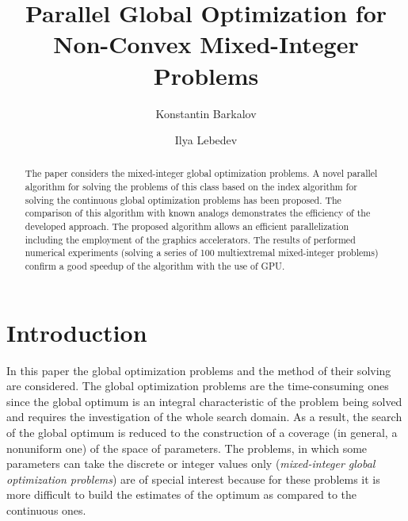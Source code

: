 \documentclass{llncs}
\begin{document}
\mainmatter 

\title{Parallel Global Optimization for Non-Convex Mixed-Integer Problems
}
\author{Konstantin Barkalov \and Ilya Lebedev %
\\
}


\maketitle

\begin{abstract}

The paper considers the mixed-integer global optimization problems. A novel 
parallel algorithm for solving the problems of this class based on the index 
algorithm for solving the continuous global optimization problems has been proposed. 
The comparison of this algorithm with known analogs demonstrates the efficiency of the 
developed approach. 
The proposed algorithm allows an efficient parallelization including the employment of the 
graphics accelerators. The results of performed numerical experiments (solving a series of 100 multiextremal mixed-integer problems) confirm a good speedup of the algorithm with the use of GPU. 


\end{abstract}

\section{Introduction}\label{sec:intro}

In this paper the global optimization problems and the method of their solving are 
considered. The global optimization problems are the time-consuming ones since the global 
optimum is an integral characteristic of the problem being solved and requires the investigation 
of the whole search domain. 
As a result, the search of the global optimum is reduced to the construction of a coverage (in 
general, a nonuniform one) of the space of parameters. 
The problems, in which some parameters can take the discrete or integer values only (\textit{mixed-integer global 
optimization problems}) are of special interest because for these problems it is more difficult to build 
the estimates of the optimum as compared to the continuous ones.
\end{document}
